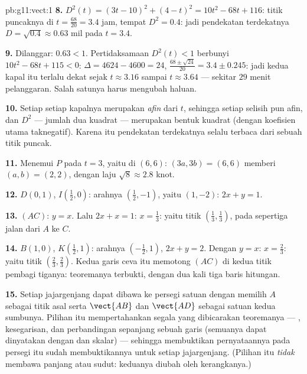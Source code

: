 \begin{solution}{pb:g11:vect:1}
\textbf{8.} $D^2(t) = (3t - 10)^2 + (4 - t)^2 =
10t^2 - 68t + 116$: titik puncaknya di $t = \frac{68}{20} = 3.4$ jam,
tempat $D^2 = 0.4$: jadi pendekatan terdekatnya
$D = \sqrt{0.4} \approx 0.63$ mil pada $t = 3.4$.

\textbf{9.} Dilanggar: $0.63 < 1$. Pertidaksamaan $D^2(t) < 1$ berbunyi
$10t^2 - 68t + 115 < 0$: $\Delta = 4624 - 4600 = 24$, 
$\frac{68 \pm \sqrt{24}}{20} = 3.4 \pm 0.245$: jadi kedua kapal itu
terlalu dekat sejak $t \approx 3.16$ sampai $t \approx 3.64$ --- sekitar
$29$ menit pelanggaran. Salah satunya harus mengubah haluan.

\textbf{10.} Setiap  setiap kapalnya merupakan  \emph{afin}
dari $t$, sehingga setiap selisih  pun afin,
dan $D^2$ --- jumlah dua kuadrat  --- merupakan
bentuk kuadrat (dengan koefisien utama taknegatif). Karena itu pendekatan
terdekatnya selalu terbaca dari sebuah titik puncak.

\textbf{11.} Menemui $P$ pada $t = 3$, yaitu di $(6, 6)$:
$(3a, 3b) = (6, 6)$ memberi $(a, b) = (2, 2)$, dengan laju
$\sqrt{8} \approx 2.8$ knot.

\textbf{12.} $D(0, 1)$, $I\left(\frac12, 0\right)$: arahnya
$\left(\frac12, -1\right)$, yaitu $(1, -2)$: 
$2x + y = 1$.

\textbf{13.} $(AC)$: $y = x$. Lalu $2x + x = 1$:
$x = \frac13$: yaitu titik $\left(\frac13, \frac13\right)$, pada
sepertiga jalan dari $A$ ke $C$.

\textbf{14.} $B(1, 0)$, $K\left(\frac12, 1\right)$: arahnya
$\left(-\frac12, 1\right)$,  $2x + y = 2$. Dengan
$y = x$: $x = \frac23$: yaitu titik
$\left(\frac23, \frac23\right)$. Kedua garis ceva itu memotong $(AC)$ di
kedua titik pembagi tiganya: teoremanya terbukti, dengan dua kali tiga baris
hitungan.

\textbf{15.} Setiap jajargenjang dapat dibawa ke persegi satuan
dengan memilih $A$ sebagai titik asal serta $\vect{AB}$ dan $\vect{AD}$ sebagai
satuan kedua sumbunya. Pilihan itu mempertahankan segala yang dibicarakan
teoremanya --- , kesegarisan, dan perbandingan sepanjang sebuah
garis (semuanya dapat dinyatakan dengan  dan skalar) --- sehingga
membuktikan pernyataannya pada persegi itu sudah membuktikannya untuk setiap
jajargenjang. (Pilihan itu \emph{tidak} membawa panjang atau sudut: keduanya
diubah oleh kerangkanya.)


\end{solution}
